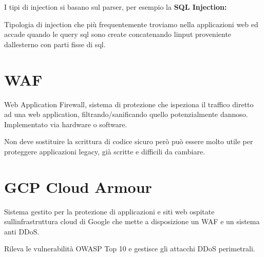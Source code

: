 I tipi di injection si basano sul parser, per esempio la \textbf{SQL
Injection:}

Tipologia di injection che più frequentemente troviamo nella
applicazioni web ed accade quando le query sql sono create concatenando
l\textquotesingle input proveniente dall\textquotesingle esterno con
parti fisse di sql.

\section{WAF}\label{waf}

Web Application Firewall, sistema di protezione che ispeziona il
traffico diretto ad una web application, filtrando/sanificando quello
potenzialmente dannoso. Implementato via hardware o software.

Non deve sostituire la scrittura di codice sicuro però può essere molto
utile per proteggere applicazioni legacy, già scritte e difficili da
cambiare.

\section{GCP Cloud Armour}\label{gcp-cloud-armour}

Sistema gestito per la protezione di applicazioni e siti web ospitate
sull\textquotesingle infrastruttura cloud di Google che mette a
disposizione un WAF e un sistema anti DDoS.

Rileva le vulnerabilità OWASP Top 10 e gestisce gli attacchi DDoS
perimetrali.
